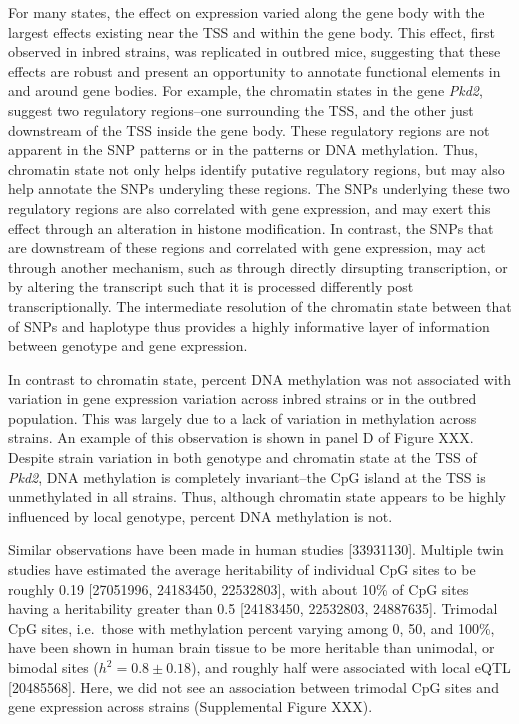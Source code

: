 \documentclass[10pt,letterpaper]{article}
\begin{document}
For many states, the effect on expression varied along the gene body
with the largest effects existing near the TSS and within the gene body.
This effect, first observed in inbred strains, was replicated in outbred
mice, suggesting that these effects are robust and present an
opportunity to annotate functional elements in and around gene bodies.
For example, the chromatin states in the gene \textit{Pkd2}, suggest two
regulatory regions--one surrounding the TSS, and the other just
downstream of the TSS inside the gene body. These regulatory regions are
not apparent in the SNP patterns or in the patterns or DNA methylation.
Thus, chromatin state not only helps identify putative regulatory
regions, but may also help annotate the SNPs underyling these regions.
The SNPs underlying these two regulatory regions are also correlated
with gene expression, and may exert this effect through an alteration in
histone modification. In contrast, the SNPs that are downstream of these
regions and correlated with gene expression, may act through another
mechanism, such as through directly dirsupting transcription, or by
altering the transcript such that it is processed differently post
transcriptionally. The intermediate resolution of the chromatin state
between that of SNPs and haplotype thus provides a highly informative
layer of information between genotype and gene expression.

In contrast to chromatin state, percent DNA methylation was not
associated with variation in gene expression variation across inbred
strains or in the outbred population. This was largely due to a lack of
variation in methylation across strains. An example of this observation
is shown in panel D of Figure XXX. Despite strain variation in both
genotype and chromatin state at the TSS of \textit{Pkd2}, DNA
methylation is completely invariant--the CpG island at the TSS is
unmethylated in all strains. Thus, although chromatin state appears to
be highly influenced by local genotype, percent DNA methylation is not.

Similar observations have been made in human studies {[}33931130{]}.
Multiple twin studies have estimated the average heritability of
individual CpG sites to be roughly 0.19 {[}27051996, 24183450,
22532803{]}, with about 10\% of CpG sites having a heritability greater
than 0.5 {[}24183450, 22532803, 24887635{]}. Trimodal CpG sites,
i.e.~those with methylation percent varying among 0, 50, and 100\%, have
been shown in human brain tissue to be more heritable than unimodal, or
bimodal sites (\(h^2 = 0.8 \pm 0.18\)), and roughly half were associated
with local eQTL {[}20485568{]}. Here, we did not see an association
between trimodal CpG sites and gene expression across strains
(Supplemental Figure XXX).
\end{document}
